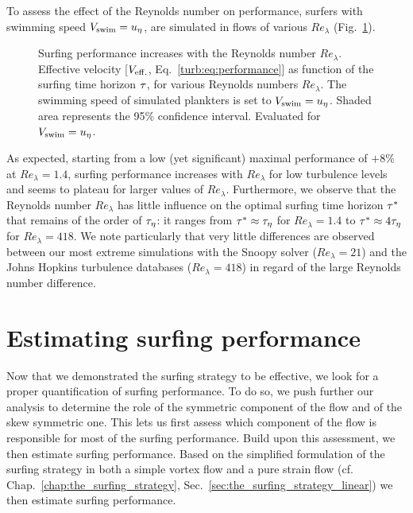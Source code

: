 To assess the effect of the Reynolds number on performance, surfers with swimming speed $V_{\mathrm{swim}} = u_{\eta}$, are simulated in flows of various $\mathit{Re}_{\lambda}$ (Fig.~\ref{fig:surfing_parameter_tau_reynolds}).
\begin{figure}%
	\centering
	
	\caption[Surfing performance increases with the Reynolds number $\mathit{Re}_{\lambda}$.]{
		Surfing performance increases with the Reynolds number $\mathit{Re}_{\lambda}$.
		Effective velocity [$V_{\mathrm{eff.}}$, Eq.~\eqref{turb:eq:performance}] as function of the surfing time horizon $\tau$, for various Reynolds numbers $\mathit{Re}_{\lambda}$.
		The swimming speed of simulated plankters is set to $V_{\mathrm{swim}} = u_{\eta}$.
		Shaded area represents the 95\% confidence interval.
		Evaluated for $V_{\mathrm{swim}} = u_{\eta}$.
	}
	\label{fig:surfing_parameter_tau_reynolds}
\end{figure}
As expected, starting from a low (yet significant) maximal performance of $+8\%$ at $\mathit{Re}_{\lambda} = 1.4$, surfing performance increases with $\mathit{Re}_{\lambda}$ for low turbulence levels and seems to plateau for larger values of $\mathit{Re}_{\lambda}$.
Furthermore, we observe that the Reynolds number $\mathit{Re}_{\lambda}$ has little influence on the optimal surfing time horizon $\tau^*$ that remains of the order of $\tau_{\eta}$: it ranges from $\tau^* \approx \tau_{\eta}$ for $\mathit{Re}_{\lambda} = 1.4$ to $\tau^* \approx 4\tau_{\eta}$ for $\mathit{Re}_{\lambda} = 418$.
We note particularly that very little differences are observed between our most extreme simulations with the Snoopy solver ($\mathit{Re}_{\lambda} = 21$) and the Johns Hopkins turbulence databases ($\mathit{Re}_{\lambda} = 418$) in regard of the large Reynolds number difference.

\section{Estimating surfing performance}\label{sec:estimating_surfing_performance}

Now that we demonstrated the surfing strategy to be effective, we look for a proper quantification of surfing performance.
To do so, we push further our analysis to determine the role of the symmetric component of the flow and of the skew symmetric one.
This lets us first assess which component of the flow is responsible for most of the surfing performance.
Build upon this assessment, we then estimate surfing performance.
Based on the simplified formulation of the surfing strategy in both a simple vortex flow and a pure strain flow (cf. Chap.~\ref{chap:the_surfing_strategy}, Sec.~\ref{sec:the_surfing_strategy_linear}) we then estimate surfing performance.

